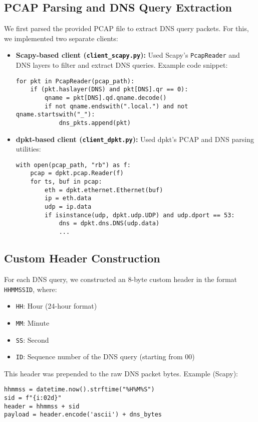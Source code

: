 \documentclass[10pt,a4paper]{report}
\begin{document}
\subsection{PCAP Parsing and DNS Query Extraction}
We first parsed the provided PCAP file to extract DNS query packets. For this, we implemented two separate clients:
\begin{itemize}
    \item \textbf{Scapy-based client (\texttt{client\_scapy.py}):}
    Used Scapy's \texttt{PcapReader} and DNS layers to filter and extract DNS queries. Example code snippet:
    \begin{verbatim}
for pkt in PcapReader(pcap_path):
    if (pkt.haslayer(DNS) and pkt[DNS].qr == 0):
        qname = pkt[DNS].qd.qname.decode()
        if not qname.endswith(".local.") and not qname.startswith("_"):
            dns_pkts.append(pkt)
    \end{verbatim}
    \item \textbf{dpkt-based client (\texttt{client\_dpkt.py}):}
    Used dpkt's PCAP and DNS parsing utilities:
    \begin{verbatim}
with open(pcap_path, "rb") as f:
    pcap = dpkt.pcap.Reader(f)
    for ts, buf in pcap:
        eth = dpkt.ethernet.Ethernet(buf)
        ip = eth.data
        udp = ip.data
        if isinstance(udp, dpkt.udp.UDP) and udp.dport == 53:
            dns = dpkt.dns.DNS(udp.data)
            ...
    \end{verbatim}
\end{itemize}


\subsection{Custom Header Construction}
For each DNS query, we constructed an 8-byte custom header in the format \texttt{HHMMSSID}, where:
\begin{itemize}
    \item \texttt{HH}: Hour (24-hour format)
    \item \texttt{MM}: Minute
    \item \texttt{SS}: Second
    \item \texttt{ID}: Sequence number of the DNS query (starting from 00)
\end{itemize}
This header was prepended to the raw DNS packet bytes. Example (Scapy):
\begin{verbatim}
hhmmss = datetime.now().strftime("%H%M%S")
sid = f"{i:02d}"
header = hhmmss + sid
payload = header.encode('ascii') + dns_bytes
\end{verbatim}
\end{document}
